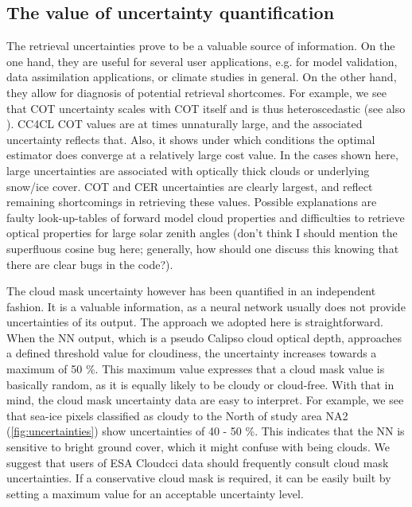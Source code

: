 \subsection{The value of uncertainty quantification}


The retrieval uncertainties prove to be a valuable source of information. On the one hand, they are useful for several user applications, e.g. for model validation, data assimilation applications, or climate studies in general. On the other hand, they allow for diagnosis of potential retrieval shortcomes. For example, we see that COT uncertainty scales with COT itself and is thus heteroscedastic (see also \citet{Poulsen12}). CC4CL COT values are at times unnaturally large, and the associated uncertainty reflects that. Also, it shows under which conditions the optimal estimator does converge at a relatively large cost value. In the cases shown here, large uncertainties are associated with optically thick clouds or underlying snow/ice cover. COT and CER uncertainties are clearly largest, and reflect remaining shortcomings in retrieving these values. Possible explanations are faulty look-up-tables of forward model cloud properties and difficulties to retrieve optical properties for large solar zenith angles (don't think I should mention the superfluous cosine bug here; generally, how should one discuss this knowing that there are clear bugs in the code?). 

The cloud mask uncertainty however has been quantified in an independent fashion. It is a valuable information, as a neural network usually does not provide uncertainties of its output. The approach we adopted here is straightforward. When the NN output, which is a pseudo Calipso cloud optical depth, approaches a defined threshold value for cloudiness, the uncertainty increases towards a maximum of 50 \%. This maximum value expresses that a cloud mask value is basically random, as it is equally likely to be cloudy or cloud-free. With that in mind, the cloud mask uncertainty data are easy to interpret. For example, we see that sea-ice pixels classified as cloudy to the North of study area NA2 (\cref{fig:uncertainties}) show uncertainties of 40 - 50 \%. This indicates that the NN is sensitive to bright ground cover, which it might confuse with being clouds. We suggest that users of ESA Cloud\textunderscore cci data should frequently consult cloud mask uncertainties. If a conservative cloud mask is required, it can be easily built by setting a maximum value for an acceptable uncertainty level.

